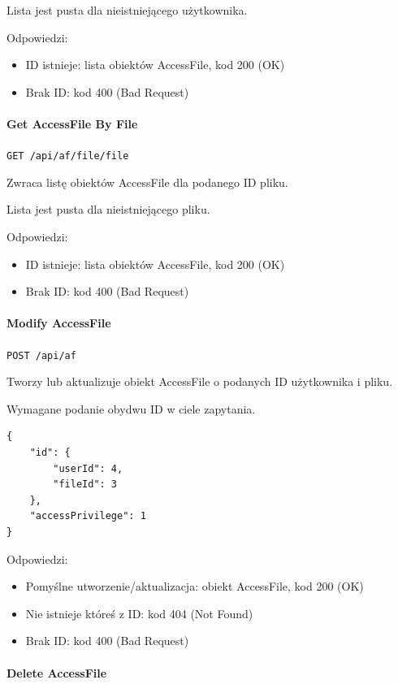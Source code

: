 \documentclass[a4paper,twoside,12pt]{book}
\begin{document}
Lista jest pusta dla nieistniejącego użytkownika.

Odpowiedzi: 
\begin{itemize}
	\item ID istnieje: lista obiektów AccessFile, kod 200 (OK) 
	\item Brak ID: kod 400 (Bad Request)
\end{itemize}

\paragraph{Get AccessFile By File}

\texttt{GET /api/af/file/{file}}

Zwraca listę obiektów AccessFile dla podanego ID pliku.

Lista jest pusta dla nieistniejącego pliku.

Odpowiedzi: 
\begin{itemize}
	\item ID istnieje: lista obiektów AccessFile, kod 200 (OK) 
	\item Brak ID: kod 400 (Bad Request)
\end{itemize}

\paragraph{Modify AccessFile}

\texttt{POST /api/af}

Tworzy lub aktualizuje obiekt AccessFile o podanych ID użytkownika i pliku.

Wymagane podanie obydwu ID w ciele zapytania.

\begin{verbatim}
{
    "id": {
        "userId": 4,
        "fileId": 3
    },
    "accessPrivilege": 1
}
\end{verbatim}

Odpowiedzi: 
\begin{itemize}
	\item Pomyślne utworzenie/aktualizacja: obiekt AccessFile, kod 200 (OK) 
	\item Nie istnieje któreś z ID: kod 404 (Not Found) 
	\item Brak ID: kod 400 (Bad Request)
\end{itemize}

\paragraph{Delete AccessFile}
\end{document}
